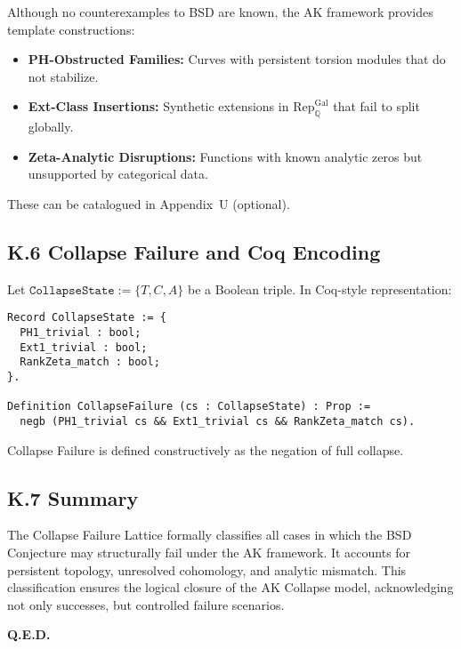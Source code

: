 \documentclass[11pt]{article}
\newcommand{\QQ}{\mathbb{Q}}
\begin{document}
Although no counterexamples to BSD are known, the AK framework provides template constructions:

\begin{itemize}
  \item \textbf{PH-Obstructed Families:} Curves with persistent torsion modules that do not stabilize.
  \item \textbf{Ext-Class Insertions:} Synthetic extensions in $\mathrm{Rep}_{\QQ}^{\mathrm{Gal}}$ that fail to split globally.
  \item \textbf{Zeta-Analytic Disruptions:} Functions with known analytic zeros but unsupported by categorical data.
\end{itemize}

These can be catalogued in Appendix~U (optional).

\subsection*{K.6 Collapse Failure and Coq Encoding}

Let $\texttt{CollapseState} := \{T, C, A\}$ be a Boolean triple.  
In Coq-style representation:

\begin{lstlisting}[language=Coq]
Record CollapseState := {
  PH1_trivial : bool;
  Ext1_trivial : bool;
  RankZeta_match : bool;
}.

Definition CollapseFailure (cs : CollapseState) : Prop :=
  negb (PH1_trivial cs && Ext1_trivial cs && RankZeta_match cs).
\end{lstlisting}

Collapse Failure is defined constructively as the negation of full collapse.

\subsection*{K.7 Summary}

The Collapse Failure Lattice formally classifies all cases in which the BSD Conjecture may structurally fail under the AK framework.  
It accounts for persistent topology, unresolved cohomology, and analytic mismatch.  
This classification ensures the logical closure of the AK Collapse model, acknowledging not only successes, but controlled failure scenarios.

\begin{flushright}
\textbf{Q.E.D.}
\end{flushright}
\end{document}
